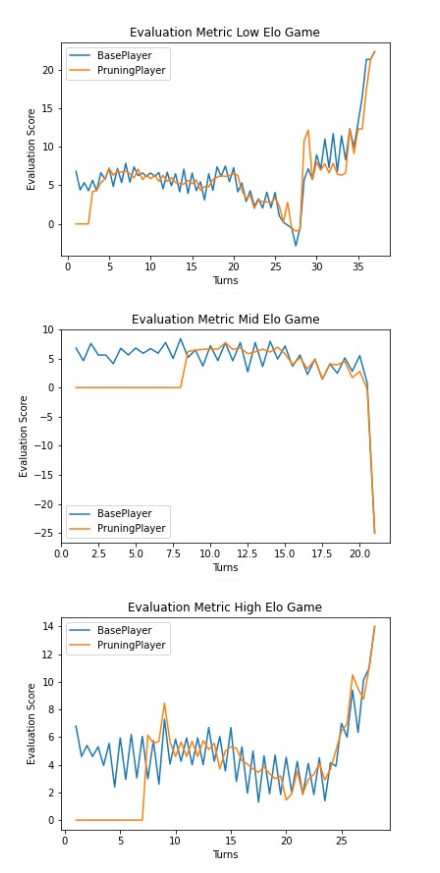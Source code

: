 \documentclass[letterpaper]{article}
\begin{document}
\begin{figure}
    \center

    \includegraphics[scale= 0.35]{low_game_eval.jpg}
    \includegraphics[scale= 0.35]{mid_game_eval.jpg}
    \includegraphics[scale= 0.35]{high_game_eval.jpg}


\end{figure}
\end{document}
